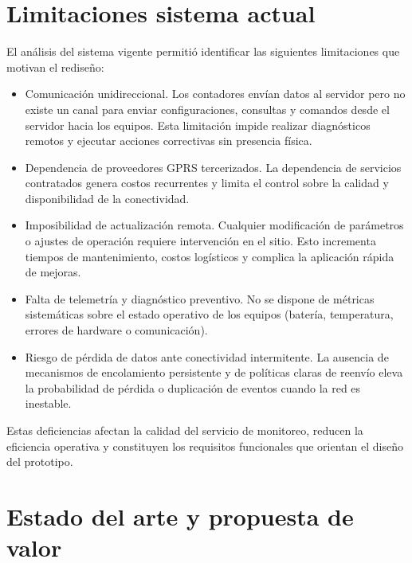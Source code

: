 
\section{Limitaciones sistema actual}

El análisis del sistema vigente permitió identificar las siguientes limitaciones que motivan el rediseño:

\begin{itemize}
\item  Comunicación unidireccional. Los contadores envían datos al servidor pero no existe un canal para enviar configuraciones, consultas y comandos desde el servidor hacia los equipos. Esta limitación impide realizar diagnósticos remotos y ejecutar acciones correctivas sin presencia física.

\item  Dependencia de proveedores GPRS tercerizados. La dependencia de servicios contratados genera costos recurrentes y limita el control sobre la calidad y disponibilidad de la conectividad.

\item  Imposibilidad de actualización remota. Cualquier modificación de parámetros o ajustes de operación requiere intervención en el sitio. Esto incrementa tiempos de mantenimiento, costos logísticos y complica la aplicación rápida de mejoras.

\item  Falta de telemetría y diagnóstico preventivo. No se dispone de métricas sistemáticas sobre el estado operativo de los equipos (batería, temperatura, errores de hardware o comunicación).

\item Riesgo de pérdida de datos ante conectividad intermitente. La ausencia de mecanismos de encolamiento persistente y de políticas claras de reenvío eleva la probabilidad de pérdida o duplicación de eventos cuando la red es inestable.

\end{itemize}

Estas deficiencias afectan la calidad del servicio de monitoreo, reducen la eficiencia operativa y constituyen los requisitos funcionales que orientan el diseño del prototipo.


\section{Estado del arte y propuesta de valor}

